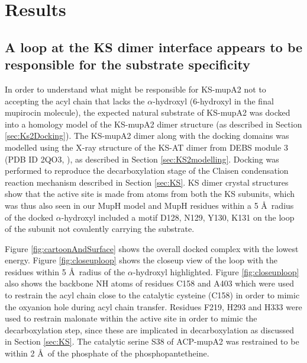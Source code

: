\section{Results}
\label{chap6:results}
	
	\subsection{A loop at the KS dimer interface appears to be responsible for the substrate specificity}
	\label{sec:ksspecificity}
	In order to understand what might be responsible for KS-mupA2 not to accepting the acyl chain that lacks the $ \alpha $-hydroxyl (6-hydroxyl in the final mupirocin molecule), the expected natural substrate of KS-mupA2 was docked into a homology model of the KS-mupA2 dimer structure (as described in Section \ref{sec:Ks2Docking}). The KS-mupA2 dimer along with the docking domains was modelled using the X-ray structure of the KS-AT dimer from DEBS module 3 (PDB ID 2QO3, \parencite{Tang2007}), as described in Section \ref{sec:KS2modelling}. Docking was performed to reproduce the decarboxylation stage of the Claisen condensation reaction mechanism described in Section \ref{sec:KS}. KS dimer crystal structures show that the active site is made from atoms from both the KS subunits, which was thus also seen in our MupH model and MupH residues within a 5 \AA \ radius of the docked $ \alpha $-hydroxyl included a motif D128, N129, Y130, K131 on the loop of the subunit not covalently carrying the substrate. 
	
	Figure \ref{fig:cartoonAndSurface} shows the overall docked complex with the lowest energy. Figure \ref{fig:closeuploop} shows the closeup view of the loop with the residues within 5 \AA \ radius of the $ \alpha $-hydroxyl highlighted. Figure  \ref{fig:closeuploop} also shows the backbone NH atoms of residues C158 and A403 which were used to restrain the acyl chain close to the catalytic cysteine (C158) in order to mimic the oxyanion hole during acyl chain transfer. Residues F219, H293 and H333 were used to restrain malonate within the active site in order to mimic the decarboxylation step, since these are implicated in decarboxylation as discussed in Section \ref{sec:KS}. The catalytic serine S38 of ACP-mupA2 was restrained to be within 2 \AA \ of the phosphate of the phosphopantetheine. 
	
